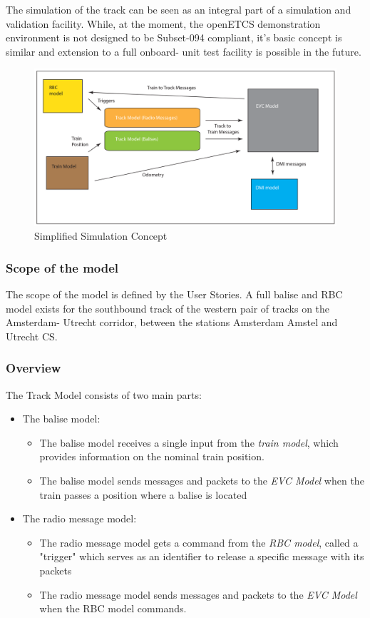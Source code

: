 \documentclass{template/openetcs_article}
\begin{document}
The simulation of the track can be seen as an integral part of a simulation and validation facility. While, at the moment, the openETCS demonstration environment is not designed to be Subset-094 compliant, it's basic concept is similar and extension to a full onboard- unit test facility is possible in the future.\newline
\begin{figure}[H]
  \centering
  \includegraphics[width=\textwidth]{images/SimArch}
  \caption{Simplified Simulation Concept}
  \label{fig:simconcept}
\end{figure}


\subsubsection{Scope of the model}

The scope of the model is defined by the User Stories. A full balise and RBC model exists for the southbound track of the western pair of tracks on the Amsterdam- Utrecht corridor, between the stations Amsterdam Amstel and Utrecht CS.

\subsubsection{Overview}

The Track Model consists of two main parts:
\begin{itemize}
 \item The balise model:
  \begin{itemize} 
   \item The balise model receives a single input from the \emph{train model}, which provides information on the nominal train position.
   \item The balise model sends messages and packets to the \emph{EVC Model} when the train passes a position where a balise is located
  \end{itemize}
 \item The radio message model:
  \begin{itemize}
   \item The radio message model gets a command from the \emph{RBC model}, called a "trigger" which serves as an identifier to release a specific message with its packets
   \item The radio message model sends messages and packets  to the \emph{EVC Model} when the RBC model commands.
  \end{itemize}
\end{itemize}
\end{document}
